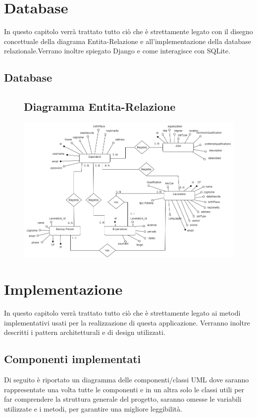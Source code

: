 \documentclass[ 4paper,11pt,openany]{book}
\begin{document}
	
	
\chapter{Database}
In questo capitolo verrà trattato tutto ciò che è strettamente legato con il disegno concettuale della diagrama Entita-Relazione e all'implementazione della database relazionale.Verrano inoltre spiegato Django e come interagisce con SQLite.
\section{Database}
\begin{figure}[htpb!] 
	\section{Diagramma Entita-Relazione} 
	\includegraphics[width=185mm]{Database.png}
\end{figure}
	
	
	
\chapter{Implementazione}
In questo capitolo verrà trattato tutto ciò che è strettamente legato ai metodi implementativi usati per la realizzazione di questa applicazione. Verranno inoltre descritti i pattern architetturali e di design utilizzati.
	
\section{Componenti implementati}
Di seguito è riportato un diagramma delle componenti/classi UML dove saranno rappresentate una volta tutte le componenti e in un altra solo le classi utili per far comprendere la struttura generale del progetto, saranno omesse le variabili utilizzate e i metodi, per garantire una migliore leggibilità.
	
\end{document}
